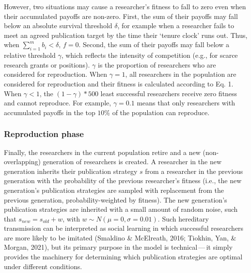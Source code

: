 \documentclass[
  british,
  a4paper,
  ,man,floatsintext]{apa6}
\begin{document}
However, two situations may cause a researcher's fitness to fall to zero even when their accumulated payoffs are non-zero.
First, the sum of their payoffs may fall below an absolute survival threshold \(\delta\), for example when a researcher fails to meet an agreed publication target by the time their `tenure clock' runs out.
Thus, when \(\sum_{i=1}^{m} b_i < \delta\), \(f = 0\).
Second, the sum of their payoffs may fall below a relative threshold \(\gamma\), which reflects the intensity of competition (e.g., for scarce research grants or positions).
\(\gamma\) is the proportion of researchers who are considered for reproduction.
When \(\gamma = 1\), all researchers in the population are considered for reproduction and their fitness is calculated according to Eq. 1.
When \(\gamma < 1\), the \((1 - \gamma)*500\) least successful researchers receive zero fitness and cannot reproduce.
For example, \(\gamma = 0.1\) means that only researchers with accumulated payoffs in the top \(10\%\) of the population can reproduce.

\subsubsection{Reproduction phase}\label{reproduction-phase}

Finally, the researchers in the current population retire and a new (non-overlapping) generation of researchers is created.
A researcher in the new generation inherits their publication strategy \(s\) from a researcher in the previous generation with the probability of the previous researcher's fitness (i.e., the new generation's publication strategies are sampled with replacement from the previous generation, probability-weighted by fitness).
The new generation's publication strategies are inherited with a small amount of random noise, such that \(s_{new} = s_{old} + w\), with \(w \sim N(\mu = 0, \sigma = 0.01)\).
Such hereditary transmission can be interpreted as social learning in which successful researchers are more likely to be imitated (Smaldino \& McElreath, 2016; Tiokhin, Yan, \& Morgan, 2021), but its primary purpose in the model is technical\(\,\)---\(\,\)it simply provides the machinery for determining which publication strategies are optimal under different conditions.
\end{document}
